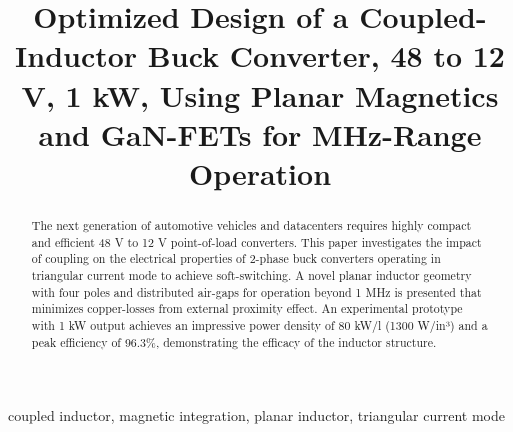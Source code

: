 \documentclass{IPEC2026}
\begin{document}
\title{Optimized Design of a Coupled-Inductor Buck Converter, 48 to 12 V, 1 kW, Using Planar Magnetics and GaN-FETs for MHz-Range Operation
}


\maketitle

\begin{abstract}
The next generation of automotive vehicles and datacenters requires highly compact and efficient 48 V to 12 V point-of-load converters. This paper investigates the impact of coupling on the electrical properties of 2-phase buck converters operating in triangular current mode to achieve soft-switching. A novel planar inductor geometry with four poles and distributed air-gaps for operation beyond 1 MHz is presented that minimizes copper-losses from external proximity effect. An experimental prototype with 1 kW output achieves an impressive power density of 80 kW/l (1300 W/in³) and a peak efficiency of 96.3\%, demonstrating the efficacy of the inductor structure.
\end{abstract}

\begin{IEEEkeywords}
coupled inductor, magnetic integration, planar inductor, triangular current mode
\end{IEEEkeywords}
\end{document}
